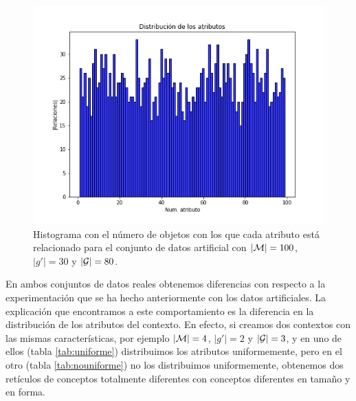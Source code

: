 \documentclass[oneside,openright,titlepage,numbers=noenddot,openany,headinclude,footinclude=true,
cleardoublepage=empty,abstractoff,BCOR=5mm,paper=a4,fontsize=12pt,main=spanish]{scrreprt}
\begin{document}
\begin{figure}[H]
  \centering
  \includegraphics[scale=0.4]{images/distribution-artificialg30G80.png}
\caption{Histograma con el número de objetos con los que cada atributo está relacionado para el conjunto de datos artificial con $|\mathcal{M}|=100$, $|g'|=30$ y $|\mathcal{G}|=80$.}
 \label{fig:distrartg30G80}
\end{figure}

En ambos conjuntos de datos reales obtenemos diferencias con respecto a la experimentación que se ha hecho anteriormente con los datos artificiales. La explicación que encontramos a este comportamiento es la diferencia en la distribución de los atributos del contexto. En efecto, si creamos dos contextos con las mismas características, por ejemplo $|\mathcal{M}|=4$, $|g'|=2$ y $|\mathcal{G}|=3$, y en uno de ellos (tabla \ref{tab:uniforme}) distribuimos los atributos uniformemente, pero en el otro (tabla \ref{tab:nouniforme}) no los distribuimos uniformemente, obtenemos dos retículos de conceptos totalmente diferentes con conceptos diferentes en tamaño y en forma.
\end{document}
